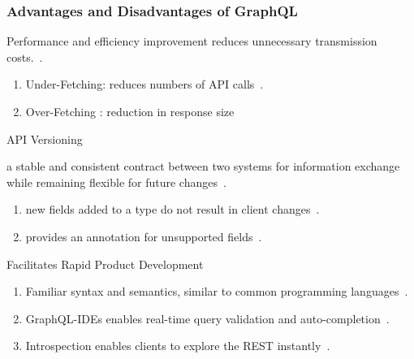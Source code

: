 \begin{frame}\frametitle{Advantages and Disadvantages of GraphQL}

\footnotesize

\begin{block}{Performance and efficiency improvement}
reduces unnecessary transmission costs.~\cite{migrating-to-gql,real-time-sys-arc-based-on-gql,gql-iot}.
\begin{enumerate}
  \item Under-Fetching: reduces  numbers of API calls~\cite{migrating-to-gql,gql-healthcare}.
  \item Over-Fetching : reduction in response size
\end{enumerate}

\end{block}

\begin{block}{API Versioning}

a stable and consistent contract between two systems for information exchange while remaining flexible for future changes~\cite{gql-healthcare}. 

\begin{enumerate}
  \item new fields added to a type do not result in client changes~\cite{migrating-to-gql}. 
  \item provides an  annotation for unsupported fields~\cite{migrating-to-gql}. 
\end{enumerate}

\end{block}

\begin{block}{Facilitates Rapid Product Development}


\begin{enumerate}
  \item  Familiar syntax and semantics, similar to common programming languages~\cite{rest-vs-gql-controlled-experiment}.
  \item GraphQL-IDEs enables real-time query validation and auto-completion~\cite{rest-vs-gql-controlled-experiment,migrating-to-gql}.
  \item Introspection enables clients to explore the REST instantly~\cite{migrating-to-gql}. 
\end{enumerate}

\end{block}


\end{frame}

